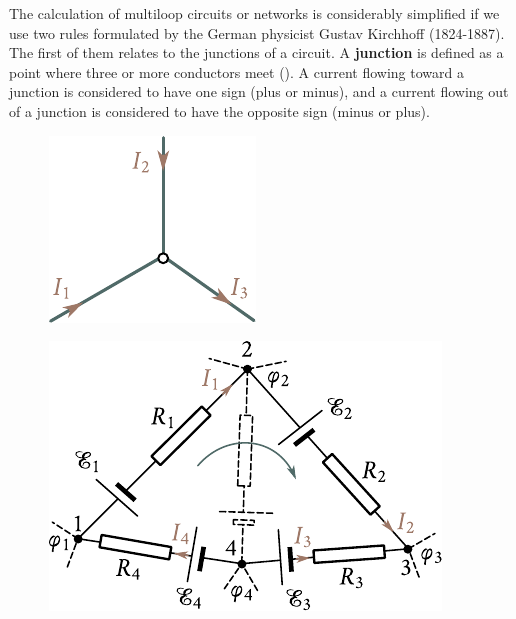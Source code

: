 The calculation of multiloop circuits or networks is considerably simplified if we use two rules formulated by the German physicist Gustav Kirchhoff (1824-1887). The first of them relates to the junctions of a circuit. A \textbf{junction} is defined as a point where three or more conductors meet (). A current flowing toward a junction is considered to have one sign (plus or minus), and a current flowing out of a junction is considered to have the opposite sign (minus or plus).


\begin{figure}[t]
	\begin{minipage}[t]{0.38\linewidth}
		\begin{center}
			\includegraphics[scale=1]{figures/ch_05/fig_5_7.pdf}
			\caption[]{}
			\label{fig:5_7}
		\end{center}
	\end{minipage}
	\hfill{ }%
	\begin{minipage}[t]{0.58\linewidth}
		\begin{center}
			\includegraphics[scale=1]{figures/ch_05/fig_5_8.pdf}
			\caption[]{}
			\label{fig:5_8}
		\end{center}
	\end{minipage}
\vspace{-0.4cm}
\end{figure}

